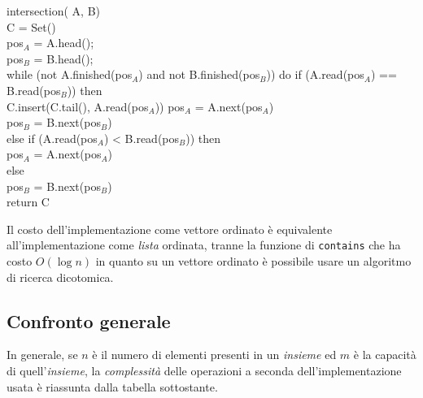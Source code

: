 \begin{codecont}
\ind{} intersection( A,  B)\\
     C = Set()\\
     pos$_A$ = A.head();\\
     pos$_B$ = B.head();\\
    \ind while (not A.finished(pos$_A$) and not B.finished(pos$_B$)) do\hfill{}
        \indf if  (A.read(pos$_A$) == B.read(pos$_B$)) then\\
            \indff C.insert(C.tail(), A.read(pos$_A$))\hfill{}
            \indff pos$_A$ = A.next(pos$_A$)\\
            \indff pos$_B$ = B.next(pos$_B$)\\
        \indf else if (A.read(pos$_A$) < B.read(pos$_B$)) then\\
            \indff pos$_A$ = A.next(pos$_A$)\\
        \indf else\\
            \indff pos$_B$ = B.next(pos$_B$)\\
    \indent return C\\
\end{codecont}
\begin{note}
    Il costo dell'implementazione come vettore ordinato è equivalente
    all'implementazione come \emph{lista} ordinata, tranne la funzione di
    \texttt{contains} che ha costo $O(\log n)$ in quanto su un vettore ordinato
    è possibile usare un algoritmo di ricerca dicotomica.
\end{note}

\subsection{Confronto generale}
In generale, se $n$ è il numero di elementi presenti in un \emph{insieme} ed \hspace{-3pt}
$m$ è la capacità di quell'\emph{insieme}, la \emph{complessità} delle operazioni
a seconda dell'implementazione usata è riassunta dalla tabella sottostante.

